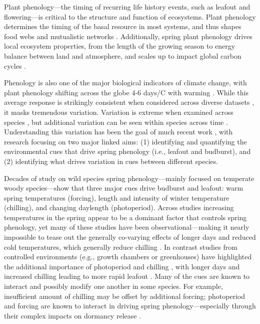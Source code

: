 \documentclass[11pt]{article}
\begin{document}
Plant phenology---the timing of recurring life history events, such as leafout and flowering---is critical to the structure and function of ecosystems. Plant phenology determines the timing of the basal resource in most systems, and thus shapes food webs and mutualistic networks \citep{Cleland:2007aa}. Additionally, spring plant phenology drives local ecosystem properties, from the length of the growing season to energy balance between land and atmosphere, and scales up to impact global carbon cycles \citep{Richardson:2009aa}. 

Phenology is also one of the major biological indicators of climate change, with plant phenology shifting across the globe 4-6 days/\degree C with warming \citep{Menzel:2006,IPCC:2014sm}. While this average response is strikingly consistent when considered across diverse datasets \citep{Wolkovich:2012aa}, it masks tremendous variation. Variation is extreme when examined across species \citep{Wolkovich:2014ab}, but additional variation can be seen within species across time \citep{yu2010,fu2015,zohner2017}. Understanding this variation has been the goal of much recent work \citep{Rutishauser:2008fu,Laube2015}, with research focusing on two major linked aims: (1) identifying and quantifying the environmental cues that drive spring phenology (i.e., leafout and budburst), and (2) identifying what drives variation in cues between different species.

Decades of study on wild species spring phenology---mainly focused on temperate woody species---show that three major cues drive budburst and leafout: warm spring temperatures (forcing), length and intensity of winter temperature (chilling), and changing daylength (photoperiod). Across studies increasing temperatures in the spring appear to be a dominant factor that controls spring phenology, yet many of these studies have been observational---making it nearly impossible to tease out the generally co-varying effects of longer days and reduced cold temperatures, which generally reduce chilling \citep{chuineJTB,Cook:2012pnas}. In contrast studies from controlled environments (e.g., growth chambers or greenhouses) have highlighted the additional importance of photoperiod and chilling \citep{Heide:1993b,Falusi:1996aa,Foley:2009aa,Ghelardini:2010aa,Caffarra:2011aa}, with longer days and increased chilling leading to more rapid leafout \citep{Caffarra:2011ab}. Many of the cues are known to interact and possibly modify one another in some species. For example, insufficient amount of chilling may be offset by additional forcing; photoperiod and forcing are known to interact in driving spring phenology---especially through their complex impacts on dormancy release \citep{chuineJTB}.
\end{document}
